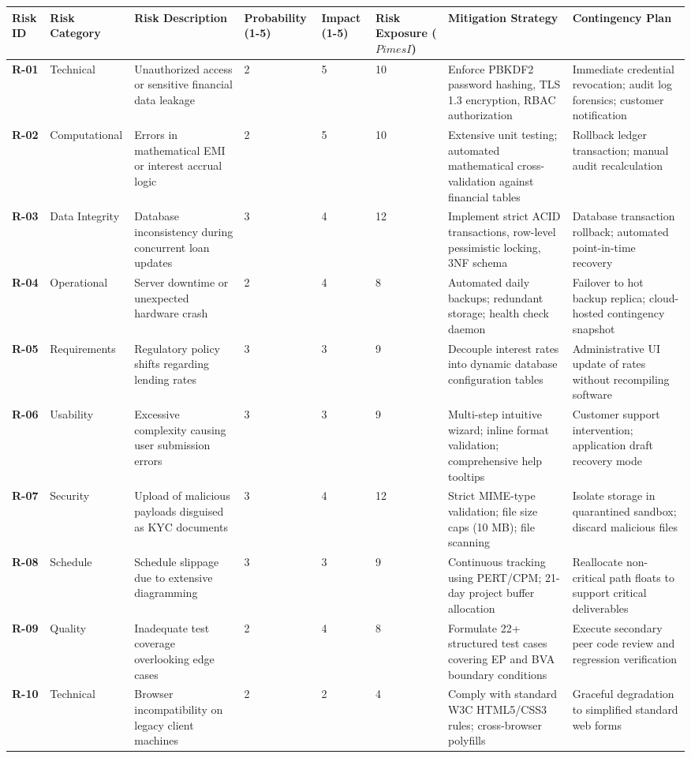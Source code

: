 \documentclass[12pt,a4paper,oneside]{report}
\begin{document}
\begin{table}[htbp]
\centering
\small
\begin{tabularx}{\textwidth}{p{2.5cm} X X X X X X X}
\toprule
\textbf{Risk ID} & \textbf{Risk Category} & \textbf{Risk Description} & \textbf{Probability (1-5)} & \textbf{Impact (1-5)} & \textbf{Risk Exposure ($P 	imes I$)} & \textbf{Mitigation Strategy} & \textbf{Contingency Plan} \\
\midrule
\textbf{R-01} & Technical & Unauthorized access or sensitive financial data leakage & 2 & 5 & 10 & Enforce PBKDF2 password hashing, TLS 1.3 encryption, RBAC authorization & Immediate credential revocation; audit log forensics; customer notification \\
\textbf{R-02} & Computational & Errors in mathematical EMI or interest accrual logic & 2 & 5 & 10 & Extensive unit testing; automated mathematical cross-validation against financial tables & Rollback ledger transaction; manual audit recalculation \\
\textbf{R-03} & Data Integrity & Database inconsistency during concurrent loan updates & 3 & 4 & 12 & Implement strict ACID transactions, row-level pessimistic locking, 3NF schema & Database transaction rollback; automated point-in-time recovery \\
\textbf{R-04} & Operational & Server downtime or unexpected hardware crash & 2 & 4 & 8 & Automated daily backups; redundant storage; health check daemon & Failover to hot backup replica; cloud-hosted contingency snapshot \\
\textbf{R-05} & Requirements & Regulatory policy shifts regarding lending rates & 3 & 3 & 9 & Decouple interest rates into dynamic database configuration tables & Administrative UI update of rates without recompiling software \\
\textbf{R-06} & Usability & Excessive complexity causing user submission errors & 3 & 3 & 9 & Multi-step intuitive wizard; inline format validation; comprehensive help tooltips & Customer support intervention; application draft recovery mode \\
\textbf{R-07} & Security & Upload of malicious payloads disguised as KYC documents & 3 & 4 & 12 & Strict MIME-type validation; file size caps (10 MB); file scanning & Isolate storage in quarantined sandbox; discard malicious files \\
\textbf{R-08} & Schedule & Schedule slippage due to extensive diagramming & 3 & 3 & 9 & Continuous tracking using PERT/CPM; 21-day project buffer allocation & Reallocate non-critical path floats to support critical deliverables \\
\textbf{R-09} & Quality & Inadequate test coverage overlooking edge cases & 2 & 4 & 8 & Formulate 22+ structured test cases covering EP and BVA boundary conditions & Execute secondary peer code review and regression verification \\
\textbf{R-10} & Technical & Browser incompatibility on legacy client machines & 2 & 2 & 4 & Comply with standard W3C HTML5/CSS3 rules; cross-browser polyfills & Graceful degradation to simplified standard web forms \\
\bottomrule
\end{tabularx}
\end{table}
\end{document}
